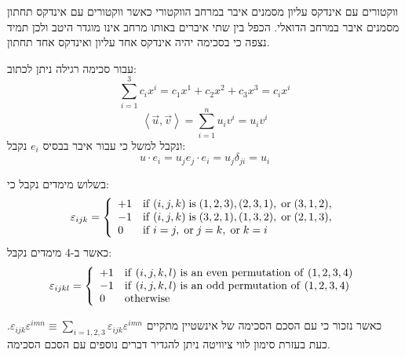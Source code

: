 \documentclass{tstextbook}
\begin{document}
\begin{remark}
ווקטורים עם אינדקס עליון מסמנים איבר במרחב הווקטורי כאשר ווקטורים עם אינדקס תחתון מסמנים איבר במרחב הדואלי. הכפל בין שתי איברים באותו מרחב אינו מוגדר היטב ולכן תמיד נצפה כי בסכימה יהיה אינדקס אחד עליון ואינדקס אחד תחתון.

\end{remark}
\begin{example}
עבור סכימה רגילה ניתן לכתוב:
$$\sum_{i=1}^{3}c_{i}x^{i}=c_{1}x^{1}+c_{2}x^{2}+c_{3}x^{3}=c_{i}x^i$$$$\left\langle  \vec{u},\vec{v}  \right\rangle =\sum_{i=1}^{n}u_{i}v^{i}=u_{i}v^{i}$$
ונקבל למשל כי עבור איבר בבסיס \(e_{i}\) נקבל:
$$u\cdot e_{i}=u_{j}e_{j}\cdot e_{i}=u_{j}\delta_{ji}=u_{i}$$

\end{example}
\begin{definition}
בשלוש מימדים נקבל כי:
$$\varepsilon_{i j k}={\left\{\begin{array}{l l}{+1}&{{\mathrm{if}}\;(i,j,k)\;{\mathrm{is}}\;(1,2,3),(2,3,1),\;{\mathrm{or}}\;(3,1,2),}\\ {-1}&{{\mathrm{if}}\;(i,j,k)\;{\mathrm{is}}\;(3,2,1),(1,3,2),\;{\mathrm{or}}\;(2,1,3),}\\ {0}&{{\mathrm{if}}\;i=j,\;{\mathrm{or}}\;j=k,\;{\mathrm{or}}\;k=i}\end{array}\right.}$$
כאשר ב-4 מימדים נקבל:
$$\varepsilon_{i j k l}={\left\{\begin{array}{l l}{+1}&{{\mathrm{if~}}(i,j,k,l){\mathrm{~is~an~even~permutation~of~}}(1,2,3,4)}\\ {-1}&{{\mathrm{if~}}(i,j,k,l){\mathrm{~is~an~odd~permutation~of~}}(1,2,3,4)}\\ {0}&{{\mathrm{otherwise}}}\end{array}\right.}$$

\end{definition}
כאשר נזכור כי עם הסכם הסכימה של אינשטיין מתקיים \(\varepsilon_{i j k}\varepsilon^{i m n}\equiv\sum_{i=1,2,3}\varepsilon_{i j k}\varepsilon^{i m n}\).
כעת בעזרת סימון לווי ציוויטה ניתן להגדיר דברים נוספים עם הסכם הסכימה.
\end{document}

